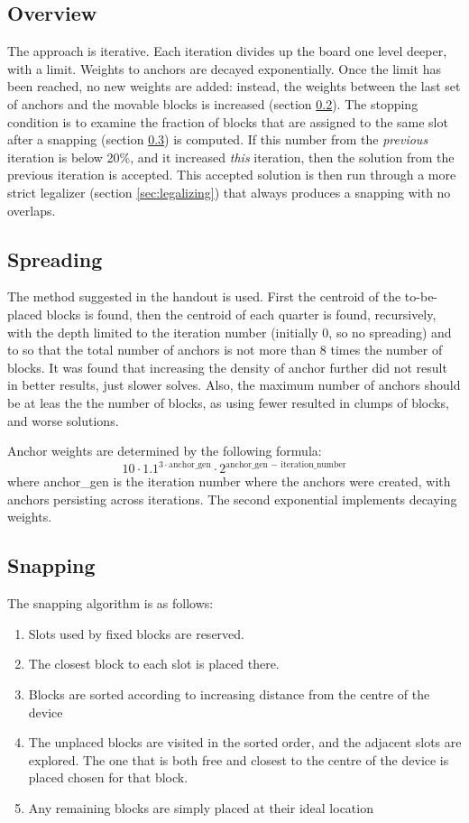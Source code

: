 \documentclass[11pt]{article}
\begin{document}
\subsection{Overview}
The approach is iterative. Each iteration divides up the board one level deeper, with a limit. Weights to anchors are decayed exponentially. Once the limit has been reached, no new weights are added: instead, the weights between the last set of anchors and the movable blocks is increased (section \ref{sec:spreading}). The stopping condition is to examine the fraction of blocks that are assigned to the same slot after a snapping (section \ref{sec:snapping}) is computed. If this number from the \emph{previous} iteration is below 20\%, and it increased \emph{this} iteration, then the solution from the previous iteration is accepted. This accepted solution is then run through a more strict legalizer (section \ref{sec:legalizing}) that always produces a snapping with no overlaps.

\subsection{Spreading}\label{sec:spreading}
The method suggested in the handout is used. First the centroid of the to-be-placed blocks is found, then the centroid of each quarter is found, recursively, with the depth limited to the iteration number (initially 0, so no spreading) and to so that the total number of anchors is not more than 8 times the number of blocks. It was found that increasing the density of anchor further did not result in better results, just slower solves. Also, the maximum number of anchors should be at leas the the number of blocks, as using fewer resulted in clumps of blocks, and worse solutions.

Anchor weights are determined by the following formula:
\[10 \cdot 1.1^{3\cdot\text{anchor_gen}} \cdot 2^{\text{anchor_gen } - \text{ iteration_number}}\]
where anchor_gen is the iteration number where the anchors were created, with anchors persisting across iterations. The second exponential implements decaying weights.

\subsection{Snapping}\label{sec:snapping}
The snapping algorithm is as follows:
\begin{enumerate}
\item Slots used by fixed blocks are reserved.
\item The closest block to each slot is placed there.
\item Blocks are sorted according to increasing distance from the centre of the device
\item The unplaced blocks are visited in the sorted order, and the adjacent slots are explored. The one that is both free and closest to the centre of the device is placed chosen for that block. \label{enum:explore-step}
\item Any remaining blocks are simply placed at their ideal location
\end{enumerate}
\end{document}
